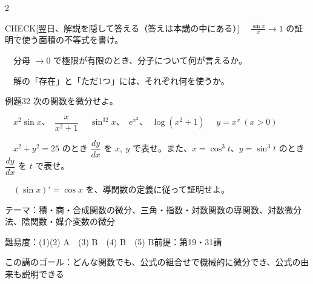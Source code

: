 \documentclass[paper=b5j, fontsize=8pt, fleqn, twoside]{jlreq}
\begin{document}
\begin{multicols*}{2}
  \begin{ptbs}{CHECK}[翌日、解説を隠して答える（答えは本講の中にある）]
    　$\frac{\sin x}x\to1$ の証明で使う面積の不等式を書け。\par
    　分母 $\to0$ で極限が有限のとき、分子について何が言えるか。\par
    　解の「存在」と「ただ1つ」には、それぞれ何を使うか。
  \end{ptbs}

  \notefill
\end{multicols*}

\begin{ascolorbox4A}[出典：オリジナル]{例題32}
  次の関数を微分せよ。\par
  　$x^2\sin x$、\ $\dfrac x{x^2+1}$\qquad
  　$\sin^32x$、\ $e^{x^2}$、\ $\log(x^2+1)$\qquad
  　$y=x^x\ (x>0)$\par
  　$x^2+y^2=25$ のとき $\dfrac{dy}{dx}$ を $x,\ y$ で表せ。また、$x=\cos^3t$、$y=\sin^3t$ のとき $\dfrac{dy}{dx}$ を $t$ で表せ。\par
  　$(\sin x)'=\cos x$ を、導関数の定義に従って証明せよ。
\end{ascolorbox4A}

\begin{Data}
  テーマ：積・商・合成関数の微分、三角・指数・対数関数の導関数、対数微分法、陰関数・媒介変数の微分\par
  難易度：(1)(2) A　(3) B　(4) B　(5) B\quad 前提：第19・31講\par
  この講のゴール：どんな関数でも、公式の組合せで機械的に微分でき、公式の由来も説明できる
\end{Data}
\end{document}
